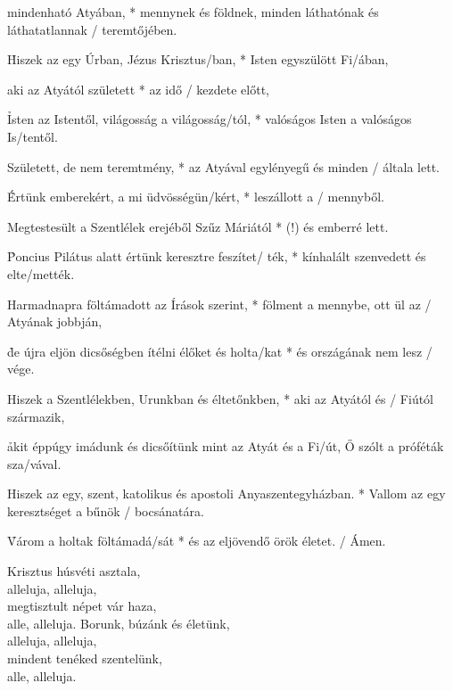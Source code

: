 \documentclass[twoside]{article}
\begin{document}






\e mindenható Atyában, * mennynek és földnek, minden láthatónak és láthatatlannak / teremtőjében.

\h Hiszek az egy Úrban, Jézus Krisztus/ban, * Isten egyszülött Fi/ában,

\e aki az Atyától született * az idő / kezdete előtt,

\h Isten az Istentől, világosság a világosság/tól, * valóságos Isten a valóságos Is/tentől.

\e Született, de nem teremtmény, * az Atyával egylényegű és minden / általa lett.

\h Értünk emberekért, a mi üdvösségün/kért, * leszállott a / mennyből.

\e  Megtestesült a Szentlélek erejéből Szűz Máriától * (!) és emberré lett.

\h Poncius Pilátus alatt értünk keresztre feszítet/ ték, * kínhalált szenvedett és elte/mették.

\e Harmadnapra föltámadott az Írások szerint, * fölment a mennybe, ott ül az / Atyának jobbján,

\h de újra eljön dicsőségben ítélni élőket és holta/kat * és országának nem lesz / vége.

\e Hiszek a Szentlélekben, Urunkban és éltetőnkben, * aki az Atyától és / Fiútól származik,

\h akit éppúgy imádunk és dicsőítünk mint az Atyát és a Fi/út, Ő szólt a próféták sza/vával.

\e Hiszek az egy, szent, katolikus és apostoli Anyaszentegyházban. * Vallom az egy keresztséget a bűnök / bocsánatára.

\h Várom a holtak föltámadá/sát * és az eljövendő örök életet. / Ámen.


\begin{hymnstanzas}
  Krisztus húsvéti asztala,\\
  alleluja, alleluja,\\
  megtisztult népet vár haza,\\
  alle, alleluja.
\stanzabreak
  Borunk, búzánk és életünk,\\
  alleluja, alleluja,\\
  mindent tenéked szentelünk,\\
  alle, alleluja.
\end{hymnstanzas}
\end{document}
